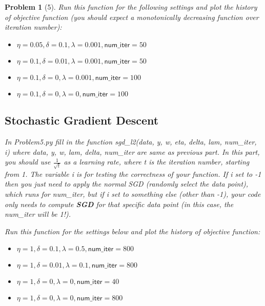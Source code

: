 \documentclass[11pt]{article}
\theoremstyle{quest}
\newtheorem*{problem}{Problem}
\begin{document}
\begin{problem}[5]
Run this function for the following settings and plot the history of objective function (you should expect a monotonically decreasing function over iteration number):

\begin{itemize}
    \item $\eta = 0.05, \delta = 0.1, \lambda = 0.001, \textsf{num\_iter}=50$
    \item $\eta = 0.1, \delta = 0.01, \lambda = 0.001, \textsf{num\_iter}=50$
    \item $\eta = 0.1, \delta = 0, \lambda = 0.001, \textsf{num\_iter}=100$
    \item $\eta = 0.1, \delta = 0, \lambda = 0, \textsf{num\_iter}=100$
\end{itemize}

\subsection*{Stochastic Gradient Descent}
In \textsf{Problem5.py} fill in the function \textsf{sgd\_l2(data, y, w, eta, delta, lam, num\_iter, i)} where \textsf{data, y, w, lam, delta, num\_iter} are same as previous part. In this part, you should use $\frac{1}{\sqrt{t}}$ as a learning rate, where \textsf{t} is the iteration number, starting from 1. The variable \textsf{i} is for testing the correctness of your function. If \textsf{i} set to -1 then you just need to apply the normal SGD (randomly select the data point), which runs for \textsf{num\_iter}, but if \textsf{i} set to something else (other than -1), your code only needs to compute \textbf{SGD} for that specific data point (in this case, the \textsf{num\_iter} will be 1!).

Run this function for the settings below and plot the history of objective function:

\begin{itemize}
    \item $\eta = 1, \delta = 0.1, \lambda = 0.5, \textsf{num\_iter}=800$
    \item $\eta = 1, \delta = 0.01, \lambda = 0.1, \textsf{num\_iter}=800$
    \item $\eta = 1, \delta = 0, \lambda = 0, \textsf{num\_iter}=40$
    \item $\eta = 1, \delta = 0, \lambda = 0, \textsf{num\_iter}=800$
\end{itemize}


\end{problem}
\end{document}
